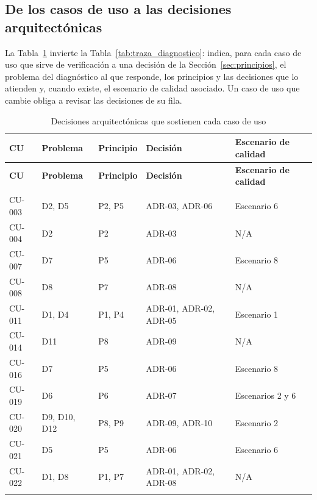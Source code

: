 \documentclass[11pt,a4paper]{article}
\DeclareRobustCommand{\_}{\textunderscore\allowbreak}
\begin{document}
\subsection{De los casos de uso a las decisiones arquitectónicas}
\label{sec:traza_cu_arq}

La Tabla~\ref{tab:traza_cu_arq} invierte la Tabla~\ref{tab:traza_diagnostico}: indica, para cada caso de uso que sirve de verificación a una decisión de la Sección~\ref{sec:principios}, el problema del diagnóstico al que responde, los principios y las decisiones que lo atienden y, cuando existe, el escenario de calidad asociado. Un caso de uso que cambie obliga a revisar las decisiones de su fila.

\begin{center}
\small
\begin{longtable}{|>{\raggedright\arraybackslash}p{}|>{\raggedright\arraybackslash}p{}|>{\raggedright\arraybackslash}p{}|>{\raggedright\arraybackslash}p{}|>{\raggedright\arraybackslash}p{}|}
\hline
\textbf{CU} & \textbf{Problema} & \textbf{Principio} & \textbf{Decisión} & \textbf{Escenario de calidad} \\
\hline
\endfirsthead
\hline
\textbf{CU} & \textbf{Problema} & \textbf{Principio} & \textbf{Decisión} & \textbf{Escenario de calidad} \\
\hline
\endhead
\hline
\multicolumn{5}{r}{\textit{Continúa en la siguiente página}} \\
\endfoot
\hline
\endlastfoot

CU-003 & D2, D5 & P2, P5 & ADR-03, ADR-06 & Escenario 6 \\
\hline
CU-004 & D2 & P2 & ADR-03 & N/A \\
\hline
CU-007 & D7 & P5 & ADR-06 & Escenario 8 \\
\hline
CU-008 & D8 & P7 & ADR-08 & N/A \\
\hline
CU-011 & D1, D4 & P1, P4 & ADR-01, ADR-02, ADR-05 & Escenario 1 \\
\hline
CU-014 & D11 & P8 & ADR-09 & N/A \\
\hline
CU-016 & D7 & P5 & ADR-06 & Escenario 8 \\
\hline
CU-019 & D6 & P6 & ADR-07 & Escenarios 2 y 6 \\
\hline
CU-020 & D9, D10, D12 & P8, P9 & ADR-09, ADR-10 & Escenario 2 \\
\hline
CU-021 & D5 & P5 & ADR-06 & Escenario 6 \\
\hline
CU-022 & D1, D8 & P1, P7 & ADR-01, ADR-02, ADR-08 & N/A \\
\hline
\caption{Decisiones arquitectónicas que sostienen cada caso de uso} \label{tab:traza_cu_arq} \\
\end{longtable}
\end{center}
\end{document}
